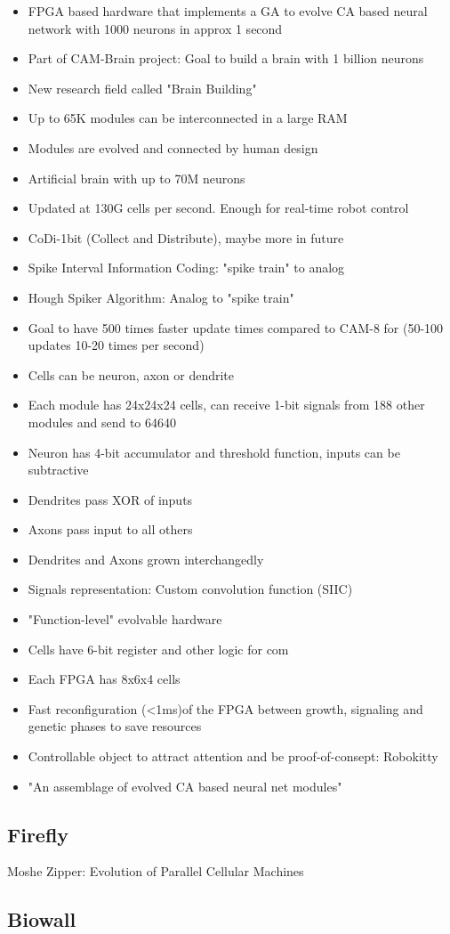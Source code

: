 \begin{itemize}
    \item FPGA based hardware that implements a GA to evolve CA based neural network with 1000 neurons in approx 1 second
    \item Part of CAM-Brain project: Goal to build a brain with 1 billion neurons
    \item New research field called "Brain Building"
    \item Up to 65K modules can be interconnected in a large RAM
    \item Modules are evolved and connected by human design
    \item Artificial brain with up to 70M neurons
    \item Updated at 130G cells per second. Enough for real-time robot control
    \item CoDi-1bit (Collect and Distribute), maybe more in future
    \item Spike Interval Information Coding: "spike train" to analog
    \item Hough Spiker Algorithm: Analog to "spike train"
    \item Goal to have 500 times faster update times compared to CAM-8 for (50-100 updates 10-20 times per second)
    \item Cells can be neuron, axon or dendrite
    \item Each module has 24x24x24 cells, can receive 1-bit signals from 188 other modules and send to 64640
    \item Neuron has 4-bit accumulator and threshold function, inputs can be subtractive
    \item Dendrites pass XOR of inputs
    \item Axons pass input to all others
    \item Dendrites and Axons grown interchangedly
    \item Signals representation: Custom convolution function (SIIC)
    \item "Function-level" evolvable hardware
    \item Cells have 6-bit register and other logic for com
    \item Each FPGA has 8x6x4 cells
    \item Fast reconfiguration (<1ms)of the FPGA between growth, signaling and genetic phases to save resources
    \item Controllable object to attract attention and be proof-of-consept: Robokitty
    \item "An assemblage of evolved CA based neural net modules"
\end{itemize}

\subsection{Firefly}

\TODO
Moshe Zipper: Evolution of Parallel Cellular Machines

\subsection{Biowall}

\TODO
